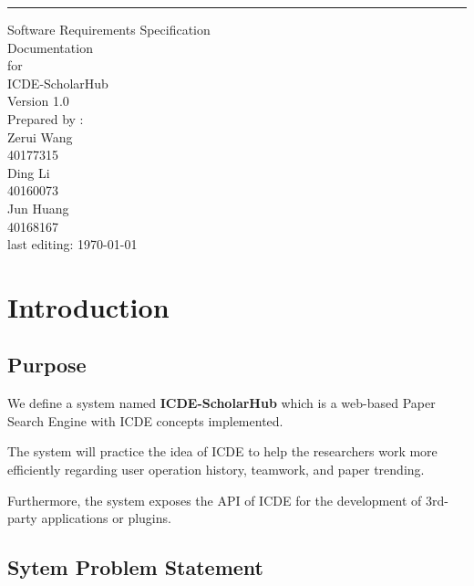 \documentclass[]{scrreprt}
\def\myversion{1.0 }
\begin{document}
\begin{flushright}
	\rule{14cm}{2pt}
	\vskip1cm
	\begin{bfseries}
		\Huge{Software Requirements Specification\\Documentation}\\
		\vspace{1.5cm}
		for\\
		\vspace{1.5cm}
		ICDE-ScholarHub\\
		\LARGE{Version \myversion}\\
		\vspace{1.5cm}
		Prepared by : \\
		Zerui Wang\\
		{\small 40177315}\\
		Ding Li\\
		{\small 40160073}\\
		Jun Huang\\
		{\small 40168167}\\
		\vspace{1.5cm}
		{\footnotesize last editing: \today}
	\end{bfseries}
\end{flushright}

\thispagestyle{empty}

\tableofcontents

\thispagestyle{empty}

\chapter{Introduction}

\section{Purpose}

We define a system named \textbf{ICDE-ScholarHub} which is a web-based Paper Search Engine with ICDE concepts implemented.

The system will practice the idea of ICDE to help the researchers work more efficiently regarding user operation history, teamwork, and paper trending.

Furthermore, the system exposes the API of ICDE for the development of 3rd-party applications or plugins.


\section{Sytem Problem Statement}
\end{document}
